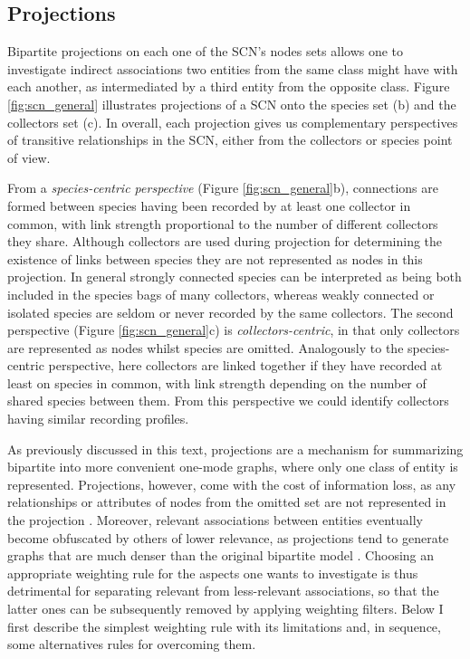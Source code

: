 {\subsection{Projections}

Bipartite projections on each one of the SCN's nodes sets allows one to investigate indirect associations two entities from the same class might have with each another, as intermediated by a third entity from the opposite class. 
Figure \ref{fig:scn_general} illustrates projections of a SCN onto the species set (b) and the collectors set (c).
In overall, each projection gives us complementary perspectives of transitive relationships in the SCN, either from the collectors or species point of view.

From a \textit{species-centric perspective} (Figure \ref{fig:scn_general}b), connections are formed between species having been recorded by at least one collector in common, with link strength proportional to the number of different collectors they share. 
Although collectors are used during projection for determining the existence of links between species they are not represented as nodes in this projection.
In general strongly connected species can be interpreted as being both included in the species bags of many collectors, whereas weakly connected or isolated species are seldom or never recorded by the same collectors.
The second perspective (Figure \ref{fig:scn_general}c) is \textit{collectors-centric}, in that only collectors are represented as nodes whilst species are omitted. 
Analogously to the species-centric perspective, here collectors are linked together if they have recorded at least on species in common, with link strength depending on the number of shared species between them. 
From this perspective we could identify collectors having similar recording profiles.

As previously discussed in this text, projections are a mechanism for summarizing bipartite into more convenient one-mode graphs, where only one class of entity is represented. 
Projections, however, come with the cost of information loss, as any relationships or attributes of nodes from the omitted set are not represented in the projection \cite{Borgatti1997}. 
Moreover, relevant associations between entities eventually become obfuscated by others of lower relevance, as projections tend to generate graphs that are much denser than the original bipartite model \cite{Lambiotte2005}.
Choosing an appropriate weighting rule for the aspects one wants to investigate is thus detrimental for separating relevant from less-relevant associations, so that the latter ones can be subsequently removed by applying weighting filters.
Below I first describe the simplest weighting rule with its limitations and, in sequence, some alternatives rules for overcoming them.

}
